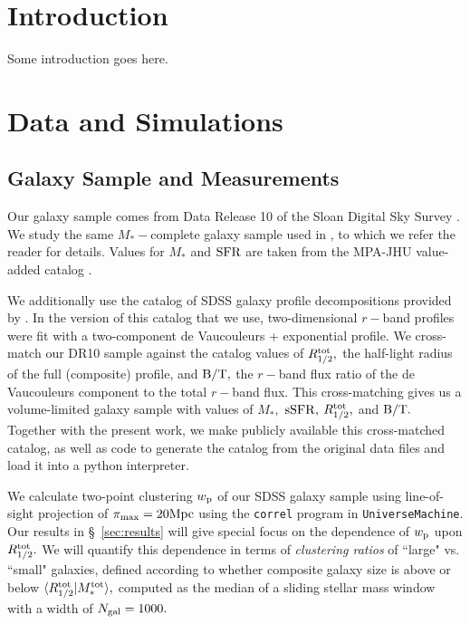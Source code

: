 \documentclass[usenatbib,usegraphicx,letterpaper]{mn2e}
\newcommand{\rhalftot}{R^{\rm tot}_{1/2}}
\newcommand{\bt}{{\rm B/T}}
\newcommand{\mstar}{M_{\ast}}
\newcommand{\mstartot}{M^{\rm tot}_{\ast}}
\newcommand{\ssfr}{{\rm sSFR}}
\newcommand{\sfr}{{\rm SFR}}
\newcommand{\wproj}{w_{\rm p}}
\newcommand{\mpc}{{\rm Mpc}}
\begin{document}
\section{Introduction}
\label{sec:intro}
Some introduction goes here.

\section{Data and Simulations}
\label{sec:data}

\subsection{Galaxy Sample and Measurements}
\label{subsec:galaxydata}


Our galaxy sample comes from Data Release 10 of the Sloan Digital Sky Survey \citep[SDSS][]{ahn_etal14}. We study the same $\mstar-$complete galaxy sample used in \citet{behroozi_etal15}, to which we refer the reader for details. Values for $\mstar$ and $\sfr$ are taken from the MPA-JHU value-added catalog \citep{kauffmann_etal03,brinchmann_etal04}.

We additionally use the catalog of SDSS galaxy profile decompositions provided by \citet{meert_etal15}. In the version of this catalog that we use, two-dimensional $r-$band profiles were fit with a two-component de Vaucouleurs + exponential profile. We cross-match our DR10 sample against the \citet{meert_etal15} catalog values of $\rhalftot,$ the half-light radius of the full (composite) profile, and $\bt,$ the $r-$band flux ratio of the de Vaucouleurs component to the total $r-$band flux. This cross-matching gives us a volume-limited galaxy sample with values of $\mstar,$ $\ssfr,$ $\rhalftot,$ and $\bt.$ Together with the present work, we make publicly available this cross-matched catalog, as well as code to generate the catalog from the original data files and load it into a python interpreter.

We calculate two-point clustering $\wproj$ of our SDSS galaxy sample using line-of-sight projection of $\pi_{\rm max}=20\mpc$ using the {\tt correl} program in {\tt UniverseMachine}. Our results in \S~\ref{sec:results} will give special focus on the dependence of $\wproj$ upon $\rhalftot.$ We will quantify this dependence in terms of {\em clustering ratios} of ``large" vs. ``small" galaxies, defined according to whether composite galaxy size is above or below $\langle\rhalftot\vert\mstartot\rangle,$ computed as the median of a sliding stellar mass window with a width of $N_{\rm gal}=1000.$
\end{document}
